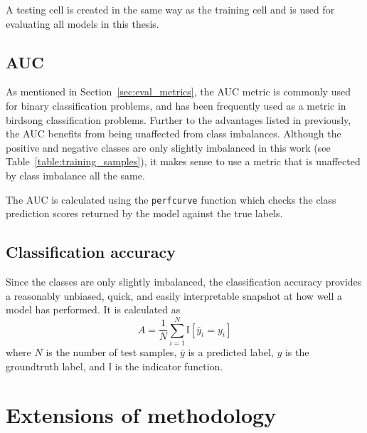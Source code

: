 A testing cell is created in the same way as the training cell and is used for
evaluating all models in this thesis.

\subsection{AUC}

As mentioned in Section~\ref{sec:eval_metrics}, the AUC metric is commonly used
for binary classification problems, and has been frequently used as a metric in
birdsong classification problems. Further to the advantages listed in 
previously, the AUC benefits from being unaffected from class imbalances.
Although the positive and negative classes are only slightly imbalanced in this
work (see Table~\ref{table:training_samples}), it makes sense to use a metric
that is unaffected by class imbalance all the same.

The AUC is calculated using the \texttt{perfcurve} function which checks the
class prediction scores returned by the model against the true labels.

\subsection{Classification accuracy}

Since the classes are only slightly imbalanced, the classification accuracy
provides a reasonably unbiased, quick, and easily interpretable snapshot at how
well a model has performed. It is calculated as
\begin{equation}
A = \frac{1}{N}\sum_{i=1}^{N} \mathbb{I}[\bar{y}_i = y_i]
\end{equation}
where $N$ is the number of test samples, $\bar{y}$ is a predicted label, $y$
is the groundtruth label, and $\mathbb{I}$ is the indicator function.

\section{Extensions of methodology}
